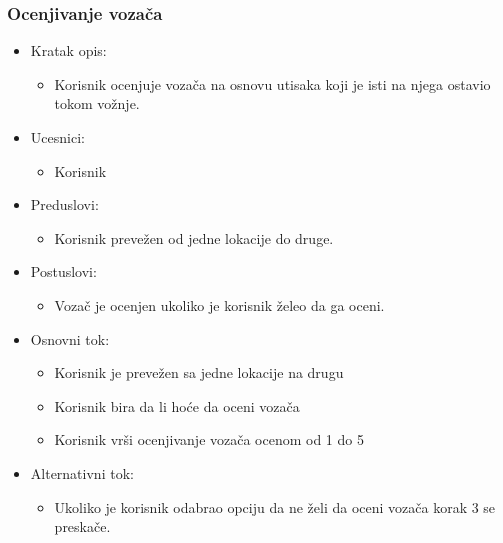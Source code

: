 \subsubsection{\bfseries Ocenjivanje voza\v ca}
\begin{itemize}
	\item Kratak opis:
		\begin{itemize}
			\item Korisnik ocenjuje vozača na osnovu utisaka koji je isti na njega ostavio tokom vožnje.
		\end{itemize}
 
	\item Ucesnici:
		\begin{itemize}
			\item Korisnik
		\end{itemize}				

	\item Preduslovi:
		\begin{itemize}
		    \item Korisnik prevežen od jedne lokacije do druge.
		\end{itemize}

	\item Postuslovi:
		\begin{itemize}
			\item Vozač je ocenjen ukoliko je korisnik želeo da ga oceni.
		\end{itemize}		


	\item Osnovni tok:
		\begin{itemize}
		    \item Korisnik je prevežen sa jedne lokacije na drugu
		    \item Korisnik bira da li hoće da oceni vozača
		    \item Korisnik vrši ocenjivanje vozača ocenom od 1 do 5 
		     
		\end{itemize}

	\item Alternativni tok:
		\begin{itemize}
    		\item Ukoliko je korisnik odabrao opciju da ne želi da oceni vozača korak 3 se preskače.
		\end{itemize}
\end{itemize}

